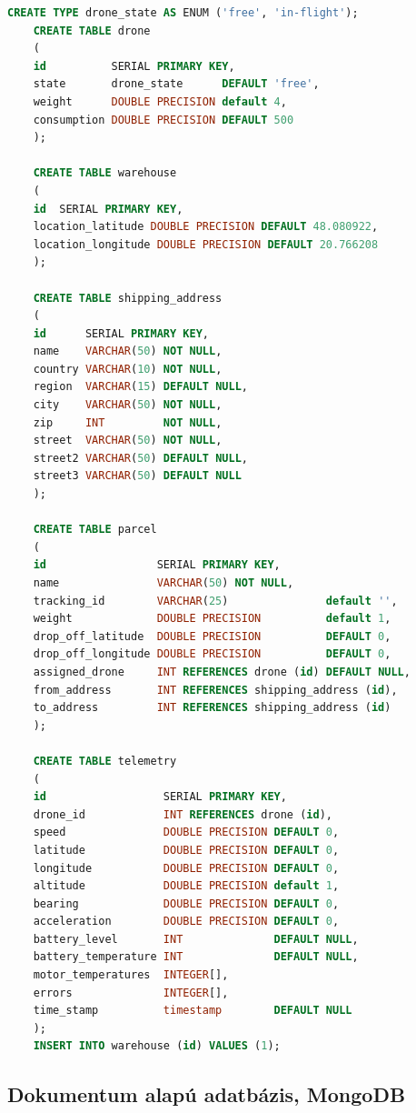 \begin{lstlisting}[language=sql]
    CREATE TYPE drone_state AS ENUM ('free', 'in-flight');
    CREATE TABLE drone
    (
    id          SERIAL PRIMARY KEY,
    state       drone_state      DEFAULT 'free',
    weight      DOUBLE PRECISION default 4,
    consumption DOUBLE PRECISION DEFAULT 500
    );

    CREATE TABLE warehouse
    (
    id  SERIAL PRIMARY KEY,
    location_latitude DOUBLE PRECISION DEFAULT 48.080922,
    location_longitude DOUBLE PRECISION DEFAULT 20.766208
    );

    CREATE TABLE shipping_address
    (
    id      SERIAL PRIMARY KEY,
    name    VARCHAR(50) NOT NULL,
    country VARCHAR(10) NOT NULL,
    region  VARCHAR(15) DEFAULT NULL,
    city    VARCHAR(50) NOT NULL,
    zip     INT         NOT NULL,
    street  VARCHAR(50) NOT NULL,
    street2 VARCHAR(50) DEFAULT NULL,
    street3 VARCHAR(50) DEFAULT NULL
    );

    CREATE TABLE parcel
    (
    id                 SERIAL PRIMARY KEY,
    name               VARCHAR(50) NOT NULL,
    tracking_id        VARCHAR(25)               default '',
    weight             DOUBLE PRECISION          default 1,
    drop_off_latitude  DOUBLE PRECISION          DEFAULT 0,
    drop_off_longitude DOUBLE PRECISION          DEFAULT 0,
    assigned_drone     INT REFERENCES drone (id) DEFAULT NULL,
    from_address       INT REFERENCES shipping_address (id),
    to_address         INT REFERENCES shipping_address (id)
    );

    CREATE TABLE telemetry
    (
    id                  SERIAL PRIMARY KEY,
    drone_id            INT REFERENCES drone (id),
    speed               DOUBLE PRECISION DEFAULT 0,
    latitude            DOUBLE PRECISION DEFAULT 0,
    longitude           DOUBLE PRECISION DEFAULT 0,
    altitude            DOUBLE PRECISION default 1,
    bearing             DOUBLE PRECISION DEFAULT 0,
    acceleration        DOUBLE PRECISION DEFAULT 0,
    battery_level       INT              DEFAULT NULL,
    battery_temperature INT              DEFAULT NULL,
    motor_temperatures  INTEGER[],
    errors              INTEGER[],
    time_stamp          timestamp        DEFAULT NULL
    );
    INSERT INTO warehouse (id) VALUES (1);
\end{lstlisting}


\subsection{Dokumentum alapú adatbázis, MongoDB}

